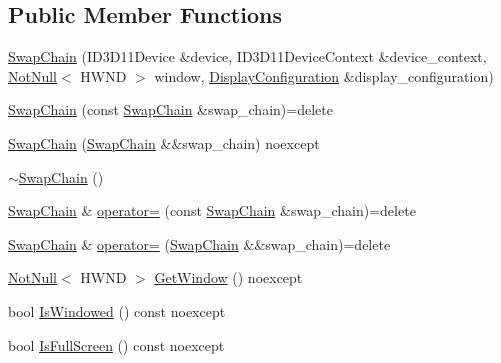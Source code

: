 \subsection*{Public Member Functions}
\begin{DoxyCompactItemize}
\item 
\mbox{\hyperlink{classmage_1_1rendering_1_1_swap_chain_a711f0c9750a2ff68a71bb9e333b2eba7}{Swap\+Chain}} (I\+D3\+D11\+Device \&device, I\+D3\+D11\+Device\+Context \&device\+\_\+context, \mbox{\hyperlink{namespacemage_a8769f9d670d6b585ea306cb1062af94b}{Not\+Null}}$<$ H\+W\+ND $>$ window, \mbox{\hyperlink{classmage_1_1rendering_1_1_display_configuration}{Display\+Configuration}} \&display\+\_\+configuration)
\item 
\mbox{\hyperlink{classmage_1_1rendering_1_1_swap_chain_a55ca2b4722e40e0f23dcacfbce75f894}{Swap\+Chain}} (const \mbox{\hyperlink{classmage_1_1rendering_1_1_swap_chain}{Swap\+Chain}} \&swap\+\_\+chain)=delete
\item 
\mbox{\hyperlink{classmage_1_1rendering_1_1_swap_chain_ae6bc03d3e49c012ff4eab712cb97e248}{Swap\+Chain}} (\mbox{\hyperlink{classmage_1_1rendering_1_1_swap_chain}{Swap\+Chain}} \&\&swap\+\_\+chain) noexcept
\item 
\mbox{\hyperlink{classmage_1_1rendering_1_1_swap_chain_ae554cc85a11c0126c645263e8ffb1cf4}{$\sim$\+Swap\+Chain}} ()
\item 
\mbox{\hyperlink{classmage_1_1rendering_1_1_swap_chain}{Swap\+Chain}} \& \mbox{\hyperlink{classmage_1_1rendering_1_1_swap_chain_a44dfcabbd320aad76853522bd084d181}{operator=}} (const \mbox{\hyperlink{classmage_1_1rendering_1_1_swap_chain}{Swap\+Chain}} \&swap\+\_\+chain)=delete
\item 
\mbox{\hyperlink{classmage_1_1rendering_1_1_swap_chain}{Swap\+Chain}} \& \mbox{\hyperlink{classmage_1_1rendering_1_1_swap_chain_a815e4c6a4dfa149c4c3218f274c1850b}{operator=}} (\mbox{\hyperlink{classmage_1_1rendering_1_1_swap_chain}{Swap\+Chain}} \&\&swap\+\_\+chain)=delete
\item 
\mbox{\hyperlink{namespacemage_a8769f9d670d6b585ea306cb1062af94b}{Not\+Null}}$<$ H\+W\+ND $>$ \mbox{\hyperlink{classmage_1_1rendering_1_1_swap_chain_ab140a96957564646ec81eabaa6ea7522}{Get\+Window}} () noexcept
\item 
bool \mbox{\hyperlink{classmage_1_1rendering_1_1_swap_chain_a7059719bc0f821baada358534b935778}{Is\+Windowed}} () const noexcept
\item 
bool \mbox{\hyperlink{classmage_1_1rendering_1_1_swap_chain_aa5643411827a2eccd04e46368193b762}{Is\+Full\+Screen}} () const noexcept

\end{DoxyCompactItemize}

